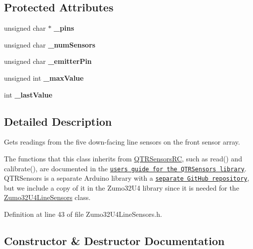 \subsection*{Protected Attributes}
\begin{DoxyCompactItemize}
\item 
\mbox{\label{class_q_t_r_sensors_ad22b7f2b4778133efa1967d683e5cb46}} 
unsigned char $\ast$ {\bfseries \+\_\+pins}
\item 
\mbox{\label{class_q_t_r_sensors_af4e3b5b4b9fd7acb0914a9f345e446f0}} 
unsigned char {\bfseries \+\_\+num\+Sensors}
\item 
\mbox{\label{class_q_t_r_sensors_a116880e22fe5e5c474e021b91e04e2ac}} 
unsigned char {\bfseries \+\_\+emitter\+Pin}
\item 
\mbox{\label{class_q_t_r_sensors_a88657f1405aa7dc840f2025b53e1a4b3}} 
unsigned int {\bfseries \+\_\+max\+Value}
\item 
\mbox{\label{class_q_t_r_sensors_a9c3c8b7ac645020c77ff8198145b46b6}} 
int {\bfseries \+\_\+last\+Value}
\end{DoxyCompactItemize}


\subsection{Detailed Description}
Gets readings from the five down-\/facing line sensors on the front sensor array. 

The functions that this class inherits from \hyperlink{class_q_t_r_sensors_r_c}{Q\+T\+R\+Sensors\+RC}, such as read() and calibrate(), are documented in the \href{https://www.pololu.com/docs/0J19}{\tt user\textquotesingle{}s guide for the Q\+T\+R\+Sensors library}. Q\+T\+R\+Sensors is a separate Arduino library with a \href{https://github.com/pololu/qtr-sensors-arduino}{\tt separate Git\+Hub repository}, but we include a copy of it in the Zumo32\+U4 library since it is needed for the \hyperlink{class_zumo32_u4_line_sensors}{Zumo32\+U4\+Line\+Sensors} class. 

Definition at line 43 of file Zumo32\+U4\+Line\+Sensors.\+h.



\subsection{Constructor \& Destructor Documentation}
\mbox{\label{class_zumo32_u4_line_sensors_af1e61e6f4e14544054712689d23a974d}} 
